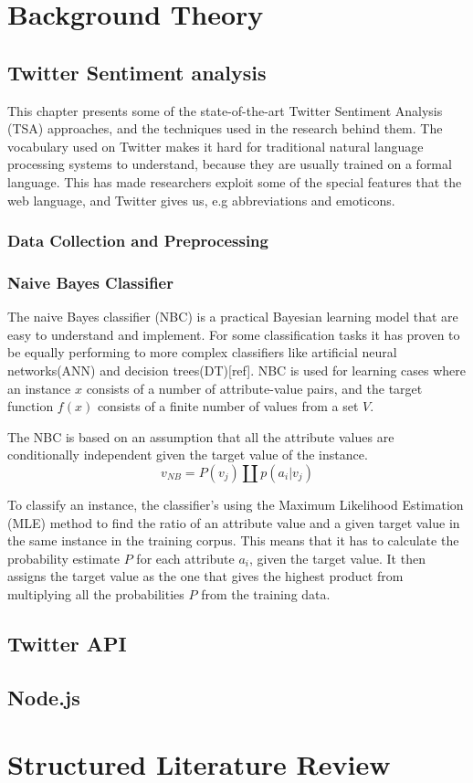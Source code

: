 \section{Background Theory}
	\subsection{Twitter Sentiment analysis}
	This chapter presents some of the state-of-the-art Twitter Sentiment Analysis (TSA) approaches, and the techniques used in the research behind them. The vocabulary used on Twitter makes it hard for traditional natural language processing systems to understand, because they are usually trained on a formal language. This has made researchers exploit some of the special features that the web language, and Twitter gives us, e.g abbreviations and emoticons.
	
		\subsubsection{Data Collection and Preprocessing}
		
		
	
	
		\subsubsection{Naive Bayes Classifier}
		The naive Bayes classifier (NBC) is a practical Bayesian learning model that are easy to understand and implement. For some classification tasks it has proven to be equally performing to more complex classifiers like artificial neural networks(ANN) and decision trees(DT)[ref]. NBC is used for learning cases where an instance $x$ consists of a number of attribute-value pairs, and the target function $f(x)$ consists of a finite number of values from a set $V$.

		The NBC is based on an assumption that all the attribute values are conditionally independent given the target value of the instance.
		\begin{equation}
		\label{equation:nbc}
		v_{NB} = P(v_j) \amalg p(a_i|v_j)
		\end{equation}
		
		To classify an instance, the classifier's using the Maximum Likelihood Estimation (MLE) method to find the ratio of an attribute value and a given target value in the same instance in the training corpus. This means that it has to calculate the probability estimate $P$ for each attribute $a_i$, given the target value. It then assigns the target value as the one that gives the highest product from multiplying all the probabilities $P$ from the training data.


	\subsection{Twitter API}
	
	
	\subsection{Node.js}
		

\section{Structured Literature Review}
